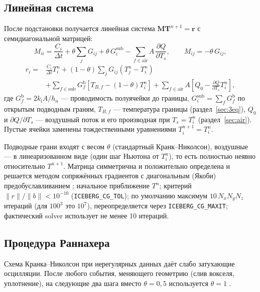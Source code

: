 \documentclass[12pt,a4paper]{article}
\newcommand{\ki}{k_{\mathrm i}}
\newcommand{\code}[1]{\texttt{\small #1}}
\begin{document}
\subsection{Линейная система}
После подстановки получается линейная система $\mathbf M\mathbf T^{n+1}=\mathbf r$ с семидиагональной матрицей:
\begin{equation}
M_{ii}=\frac{C_i}{\Delta t}+\theta\sum_{j}G_{ij}+\theta\,G^{\mathrm{sub}}_i-\sum_{f\in\mathrm{air}}A\,\frac{\partial Q}{\partial T_s},\qquad M_{ij}=-\theta\,G_{ij},
\end{equation}
\begin{equation}
\begin{split}r_i={}&\frac{C_i}{\Delta t}T_i^n+(1-\theta)\sum_jG_{ij}\left(T_j^n-T_i^n\right)\\&+\sum_{f\in\mathrm{sub}}G^{\mathrm{b}}_f\left[T_{B,f}-(1-\theta)T_i^n\right]+\sum_{f\in\mathrm{air}}A\left[Q_0-\frac{\partial Q}{\partial T_s}T_i^n\right],\end{split}
\end{equation}
где $G^{\mathrm b}_f=2\ki A/h_n$ --- проводимость полуячейки до границы, $G^{\mathrm{sub}}_i=\sum_fG^{\mathrm b}_f$ по открытым подводным граням, $T_{B,f}$ --- температура границы (раздел~\ref{sec:3eq}), $Q_0$ и $\partial Q/\partial T_s$ --- воздушный поток и его производная при $T_s=T_i^n$ (раздел~\ref{sec:air}). Пустые ячейки заменены тождественными уравнениями $T_i^{n+1}=T_i^n$.

Подводные грани входят с весом $\theta$ (стандартный Кранк--Николсон), воздушные --- в линеаризованном виде (один шаг Ньютона от $T_i^n$), то есть полностью неявно относительно $T^{n+1}$. Матрица симметрична и положительно определена и решается методом сопряжённых градиентов с диагональным (Якоби) предобуславливанием \cite{hestenes1952}; начальное приближение $T^n$; критерий $\|r\|/\|b\|<10^{-10}$ (\code{ICEBERG\_CG\_TOL}); по умолчанию максимум $10\,N_xN_yN_z$ итераций (для $100^3$ это $10^7$), переопределяется через \code{ICEBERG\_CG\_MAXIT}; фактический solver использует не менее 10 итераций.

\subsection{Процедура Раннахера}
Схема Кранка--Николсон при нерегулярных данных даёт слабо затухающие осцилляции. После любого события, меняющего геометрию (слив вокселя, уплотнение), на следующие два шага вместо $\theta=0{,}5$ используется $\theta=1$ \cite{rannacher1984}.
\end{document}
